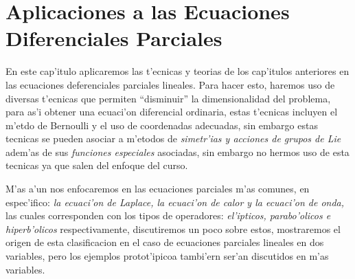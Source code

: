 \documentclass[main.tex]{subfiles}
\begin{document}
\chapter{Aplicaciones a las Ecuaciones Diferenciales Parciales}
\noindent En este cap'itulo aplicaremos las t'ecnicas y teorias de los cap'itulos anteriores en las ecuaciones deferenciales parciales lineales. Para hacer esto, haremos uso de diversas t'ecnicas que permiten ``disminuir'' la dimensionalidad del problema, para as'i obtener una ecuaci'on diferencial ordinaria, estas t'ecnicas incluyen el m'etdo de Bernoulli y el uso de coordenadas adecuadas, sin embargo estas tecnicas se pueden asociar a m'etodos de \emph{simetr'ias y acciones de grupos de Lie} adem'as de sus \emph{funciones especiales} asociadas, sin embargo no hermos uso de esta tecnicas ya que salen del enfoque del curso.

M'as a'un nos enfocaremos en las ecuaciones parciales m'as comunes, en espec'ifico: \emph{la ecuaci'on de Laplace, la ecuaci'on de calor y la ecuaci'on de onda,} las cuales corresponden con los tipos de operadores: \emph{el'ipticos, parabo'olicos e hiperb'olicos} respectivamente, discutiremos un poco sobre estos, mostraremos el origen de esta clasificacion en el caso de ecuaciones parciales lineales en dos variables, pero los ejemplos protot'ipicoa tambi'ern ser'an discutidos en m'as variables.
\end{document}
